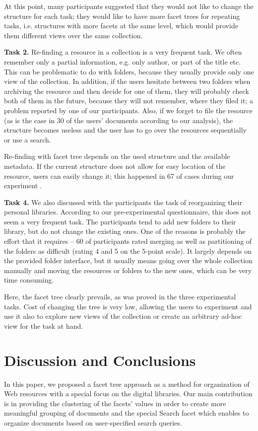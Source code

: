 \documentclass[12pt]{article}
\begin{document}
  At this point, many participants suggested that they would not like to change the structure for each task; they would like to have more facet trees for repeating tasks, i.e. structures with more facets at the same level, which would provide them different views over the same collection. 

\textbf{Task 2.} Re-finding a resource in a collection is a very frequent task. We often remember only a partial information, e.g. only author, or part of the title etc. This can be problematic to do with folders, because they usually provide only one view of the collection. In addition, if the users hesitate between two folders when archiving the resource and then decide for one of them, they will probably check both of them in the future, because they will not remember, where they filed it; a problem reported by one of our participants. Also, if we forget to file the resource (as is the case in 30 of the users’ documents according to our analysis), the structure becomes useless and the user has to go over the resources sequentially or use a search. 

Re-finding with facet tree depends on the used structure and the available metadata. If the current structure does not allow for easy location of the resource, users can easily change it; this happened in 67 of cases during our experiment . 

\textbf{Task 4.}  We also discussed with the participants the task of reorganizing their personal libraries. According to our pre-experimental questionnaire, this does not seem a very frequent task. The participants tend to add new folders to their library, but do not change the existing ones. One of the reasons is probably the effort that it requires – 60 of participants rated merging as well as partitioning of the folders as difficult (rating 4 and 5 on the 5-point scale). It largely depends on the provided folder interface, but it usually means going over the whole collection manually and moving the resources or folders to the new ones, which can be very time consuming. 

Here, the facet tree clearly prevails, as was proved in the three experimental tasks. Cost of changing the tree is very low, allowing the users to experiment and use it also to explore new views of the collection or create an arbitrary ad-hoc view for the task at hand.    

\section{Discussion and Conclusions}
In this paper, we proposed a facet tree approach as a method for organization of Web resources with a special focus on the digital libraries. Our main contribution is in providing the clustering of the facets’ values in order to create more meaningful grouping of documents and the special Search facet which enables to organize documents based on user-specified search queries. 
\end{document}
